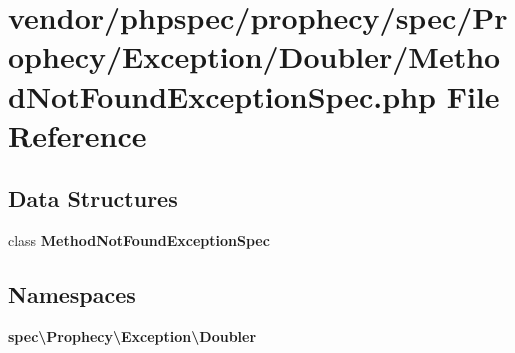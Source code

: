 \section{vendor/phpspec/prophecy/spec/\+Prophecy/\+Exception/\+Doubler/\+Method\+Not\+Found\+Exception\+Spec.php File Reference}
\label{prophecy_2spec_2_prophecy_2_exception_2_doubler_2_method_not_found_exception_spec_8php}
\subsection*{Data Structures}
\begin{DoxyCompactItemize}
\item 
class {\bf Method\+Not\+Found\+Exception\+Spec}
\end{DoxyCompactItemize}
\subsection*{Namespaces}
\begin{DoxyCompactItemize}
\item 
 {\bf spec\textbackslash{}\+Prophecy\textbackslash{}\+Exception\textbackslash{}\+Doubler}
\end{DoxyCompactItemize}
